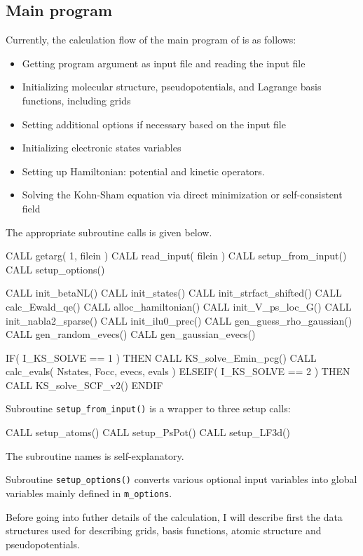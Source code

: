 \subsection{Main program}

Currently, the calculation flow of the main program of \ffrLFDFT is as follows:
\begin{itemize}
\item Getting program argument as input file and reading the input file
\item Initializing molecular structure, pseudopotentials, and 
Lagrange basis functions, including grids
\item Setting additional options if necessary based on the input file
\item Initializing electronic states variables
\item Setting up Hamiltonian: potential and kinetic operators.
\item Solving the Kohn-Sham equation via direct minimization
or self-consistent field
\end{itemize}

The appropriate subroutine calls is given below.

\begin{fortrancode}
CALL getarg( 1, filein )
CALL read_input( filein )
CALL setup_from_input()
CALL setup_options()

CALL init_betaNL()
CALL init_states()
CALL init_strfact_shifted()
CALL calc_Ewald_qe()
CALL alloc_hamiltonian()
CALL init_V_ps_loc_G()
CALL init_nabla2_sparse()
CALL init_ilu0_prec()
CALL gen_guess_rho_gaussian()
CALL gen_random_evecs()
CALL gen_gaussian_evecs()

IF( I_KS_SOLVE == 1 ) THEN 
  CALL KS_solve_Emin_pcg()
  CALL calc_evals( Nstates, Focc, evecs, evals )
ELSEIF( I_KS_SOLVE == 2 ) THEN 
  CALL KS_solve_SCF_v2()
ENDIF 
\end{fortrancode}

Subroutine {\tt setup\_from\_input()} is a wrapper to three setup calls:
\begin{fortrancode}
CALL setup_atoms()
CALL setup_PsPot()
CALL setup_LF3d()
\end{fortrancode}
The subroutine names is self-explanatory.

Subroutine {\tt setup\_options()} converts various optional input variables
into global variables mainly defined in {\tt m\_options}.

Before going into futher details of the calculation, I will describe first
the data structures used for describing grids, basis functions, atomic
structure and pseudopotentials.

